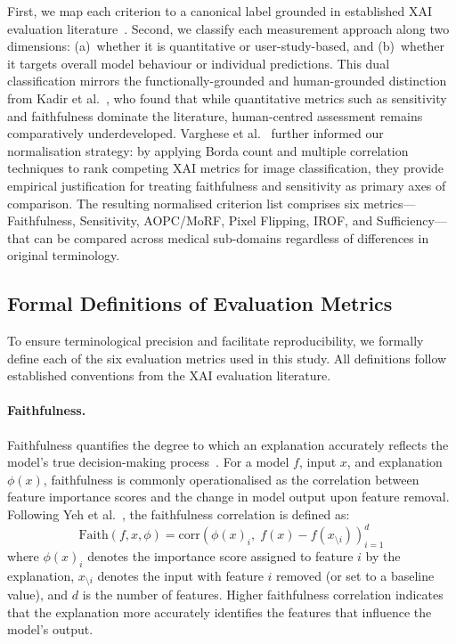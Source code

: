 First, we map each criterion to a canonical label grounded in established
XAI evaluation literature~\cite{rosenfeld2021better, kadir2023evaluation}.
Second, we classify each measurement approach along two dimensions:
(a)~whether it is quantitative or user-study-based, and (b)~whether it
targets overall model behaviour or individual predictions. This dual
classification mirrors the functionally-grounded and human-grounded distinction
from Kadir et al.~\cite{kadir2023evaluation}, who found that while quantitative
metrics such as sensitivity and faithfulness dominate the literature, human-centred
assessment remains comparatively underdeveloped. Varghese et
al.~\cite{Varghese2025OnDE} further informed our normalisation strategy: by
applying Borda count and multiple correlation techniques to rank competing XAI
metrics for image classification, they provide empirical justification for
treating faithfulness and sensitivity as primary axes of comparison. The
resulting normalised criterion list comprises six metrics---Faithfulness,
Sensitivity, AOPC/MoRF, Pixel Flipping, IROF, and Sufficiency---that can be
compared across medical sub-domains regardless of differences in original
terminology.

\subsection{Formal Definitions of Evaluation Metrics}

To ensure terminological precision and facilitate reproducibility, we formally define each of the six evaluation metrics used in this study. All definitions follow established conventions from the XAI evaluation literature.

\paragraph{Faithfulness.}
Faithfulness quantifies the degree to which an explanation accurately reflects the model's true decision-making process~\cite{yeh2019fidelity}. For a model $f$, input $x$, and explanation $\phi(x)$, faithfulness is commonly operationalised as the correlation between feature importance scores and the change in model output upon feature removal. Following Yeh et al.~\cite{yeh2019fidelity}, the faithfulness correlation is defined as:
\begin{equation}
\text{Faith}(f, x, \phi) = \text{corr}\left(\phi(x)_i,\; f(x) - f(x_{\setminus i})\right)_{i=1}^{d}
\label{eq:faithfulness}
\end{equation}
where $\phi(x)_i$ denotes the importance score assigned to feature $i$ by the explanation, $x_{\setminus i}$ denotes the input with feature $i$ removed (or set to a baseline value), and $d$ is the number of features. Higher faithfulness correlation indicates that the explanation more accurately identifies the features that influence the model's output.

